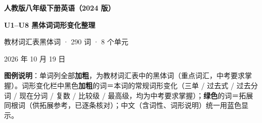 \documentclass[UTF8,a4paper,11pt]{ctexart}
\begin{document}
\begin{center}
{\sffamily\bfseries\fontsize{20pt}{26pt}\selectfont\color{headblue} 人教版八年级下册英语（2024 版）\par}
\vspace{2pt}
{\sffamily\bfseries\fontsize{17pt}{22pt}\selectfont\color{headblue} U1--U8 黑体词词形变化整理\par}
\vspace{7pt}
{\small\color{textgray} 教材词汇表黑体词 · 290 词 · 8 个单元\par}
\vspace{2pt}
{\scriptsize\color{textgray} 2026 年 10 月 19 日\par}
\end{center}
\vspace{2pt}

{\small\color{textgray}\textbf{图例说明}：单词列全部\textbf{加粗}，为教材词汇表中的黑体词（重点词汇，中考要求掌握）。词形变化栏中黑色\textbf{加粗}的词＝本词的常规词形变化（三单 / 过去式 / 过去分词 / 现在分词 / 复数 / 比较级 / 最高级，均为中考要求掌握）；\textbf{\color{cngreen}绿色}的词＝拓展同根词（供拓展参考，已逐条核对）；中文（含词性、词形说明）统一用蓝色显示。}

\vspace{4pt}
\end{document}
